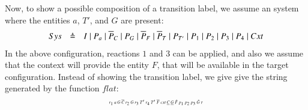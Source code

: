 Now, to show a possible composition of a transition label, we assume an system where the entities $a$, $T'$, and $G$ are present:
\[
\begin{array}{lcl}
Sys &\defeq &%
I\mid P_a\mid \overline{P}_C\mid P_G\mid \overline{P}_F \mid \overline{P}_T \mid P_{T'} \mid P_1 \mid P_2 \mid P_3 \mid P_4 \mid Cxt
\end{array}
\]
In the above configuration, reactions $1$ and $3$ can be applied, and also we assume that the context will provide the entity $F$, that will be available in the target configuration.
Instead of showing the transition label, we give give the string generated by the function $flat$:\
\[
\tiny
\begin{array}{l}
r_1~ a~G~\overline{C}~ r_2~ G~ r_3~T'~r_4~T'~\overline{F}~cxt~\underline{C}~\underline{G}~\hat{F}~p_1~p_2~p_3~\tilde{G}~\tau

\end{array}
\]



